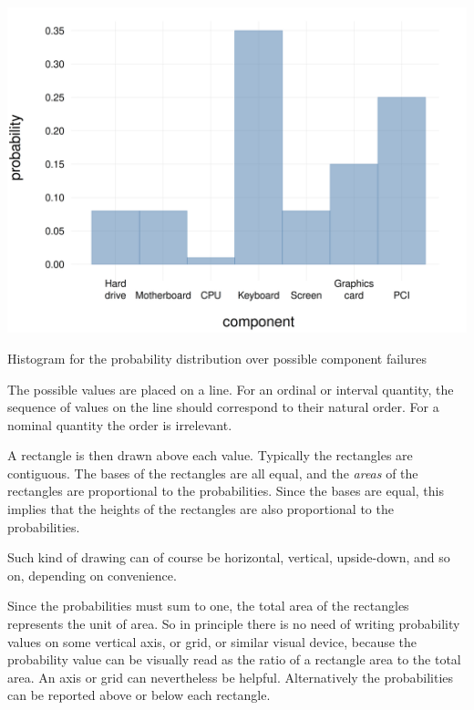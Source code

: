 \documentclass[
  a4paper,
  DIV=11,
  numbers=noendperiod,
  oneside]{scrreprt}
\begin{document}
\begin{marginfigure}

{\centering \includegraphics[width=1\textwidth,height=\textheight]{example_histogram.png}

}

\caption{Histogram for the probability distribution over possible
component failures}

\end{marginfigure}

The possible values are placed on a line. For an ordinal or interval
quantity, the sequence of values on the line should correspond to their
natural order. For a nominal quantity the order is irrelevant.

A rectangle is then drawn above each value. Typically the rectangles are
contiguous. The bases of the rectangles are all equal, and the
{\emph{areas}} of the rectangles are proportional to the probabilities.
Since the bases are equal, this implies that the heights of the
rectangles are also proportional to the probabilities.

Such kind of drawing can of course be horizontal, vertical, upside-down,
and so on, depending on convenience.

Since the probabilities must sum to one, the total area of the
rectangles represents the unit of area. So in principle there is no need
of writing probability values on some vertical axis, or grid, or similar
visual device, because the probability value can be visually read as the
ratio of a rectangle area to the total area. An axis or grid can
nevertheless be helpful. Alternatively the probabilities can be reported
above or below each rectangle.
\end{document}
